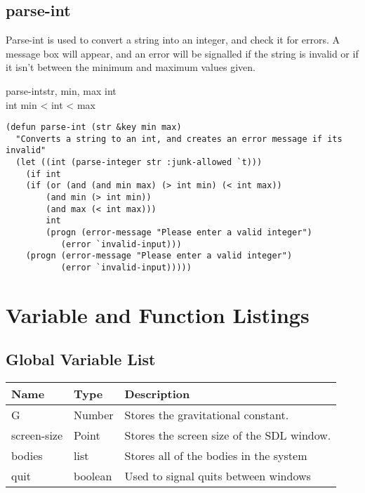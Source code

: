 \subsection{parse-int}
Parse-int is used to convert a string into an integer, and check it for errors.
A message box will appear, and an error will be signalled if the string is
invalid or if it isn't between the minimum and maximum values given.

\begin{pseudocode}{parse-int}{str, min, max}
	int \GETS {}  \\
	\IF int 
	\THEN \BEGIN \IF min < int < max 
		\THEN {} 
		\ELSE {} \END
	\ELSE {} 
\end{pseudocode}

\begin{lstlisting}
(defun parse-int (str &key min max)
  "Converts a string to an int, and creates an error message if its invalid"
  (let ((int (parse-integer str :junk-allowed `t)))
    (if int
	(if (or (and (and min max) (> int min) (< int max))
		(and min (> int min))
		(and max (< int max)))
	    int
	    (progn (error-message "Please enter a valid integer")
		   (error `invalid-input)))
	(progn (error-message "Please enter a valid integer")
	       (error `invalid-input)))))
\end{lstlisting}

\section{Variable and Function Listings}
\subsection{Global Variable List}
\begin{tabular}{p{}p{}p{}}
	Name & Type & Description \\ \hline
	G & Number & Stores the gravitational constant.\\
	screen-size & Point & Stores the screen size of the SDL window. \\
	bodies & list & Stores all of the bodies in the system \\
	quit & boolean & Used to signal quits between windows \\
\end{tabular}

